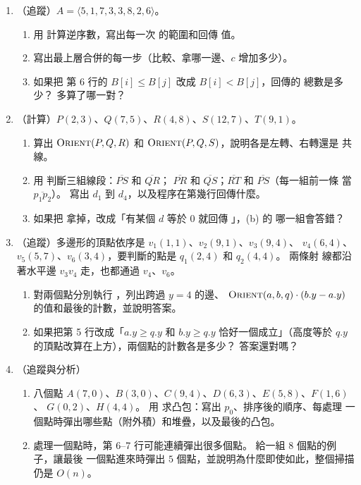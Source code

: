 \begin{enumerate}
\item \label{dc-q-inv}（追蹤）$A = \langle 5, 1, 7, 3, 3, 8, 2, 6 \rangle$。
\begin{enumerate}
\item 用  計算逆序數，寫出每一次  的範圍和回傳
值。
\item 寫出最上層合併的每一步（比較、拿哪一邊、$c$ 增加多少）。
\item 如果把  第 6 行的 $B[i] \le B[j]$ 改成 $B[i] < B[j]$，回傳的
總數是多少？ 多算了哪一對？
\end{enumerate}

\item \label{dc-q-seg}（計算）$P(2, 3)$、$Q(7, 5)$、$R(4, 8)$、$S(12, 7)$、$T(9, 1)$。
\begin{enumerate}
\item 算出 $\proc{Orient}(P, Q, R)$ 和 $\proc{Orient}(P, Q, S)$，說明各是左轉、右轉還是
共線。
\item 用  判斷三組線段：$\overline{PS}$ 和 $\overline{QR}$；
$\overline{PR}$ 和 $\overline{QS}$；$\overline{RT}$ 和 $\overline{PS}$（每一組前一條
當 $\overline{p_1 p_2}$）。 寫出 $d_1$ 到 $d_4$，以及程序在第幾行回傳什麼。
\item 如果把  拿掉，改成「有某個 $d$ 等於 $0$ 就回傳 \TRUE」，(b) 的
哪一組會答錯？
\end{enumerate}

\item \label{dc-q-pip}（追蹤）多邊形的頂點依序是 $v_1(1, 1)$、$v_2(9, 1)$、$v_3(9, 4)$、
$v_4(6, 4)$、$v_5(5, 7)$、$v_6(3, 4)$，要判斷的點是 $q_1(2, 4)$ 和 $q_2(4, 4)$。 兩條射
線都沿著水平邊 $v_3 v_4$ 走，也都通過 $v_4$、$v_6$。
\begin{enumerate}
\item 對兩個點分別執行 ，列出跨過 $y = 4$ 的邊、
$\proc{Orient}(a, b, q) \cdot (b.y - a.y)$ 的值和最後的計數，並說明答案。
\item 如果把第 5 行改成「$a.y \ge q.y$ 和 $b.y \ge q.y$ 恰好一個成立」（高度等於
$q.y$ 的頂點改算在上方），兩個點的計數各是多少？ 答案還對嗎？
\end{enumerate}

\item \label{dc-q-graham}（追蹤與分析）
\begin{enumerate}
\item 八個點 $A(7, 0)$、$B(3, 0)$、$C(9, 4)$、$D(6, 3)$、$E(5, 8)$、$F(1, 6)$、
$G(0, 2)$、$H(4, 4)$。 用  求凸包：寫出 $p_0$、排序後的順序、每處理
一個點時彈出哪些點（附外積）和堆疊，以及最後的凸包。
\item 處理一個點時，第 6--7 行可能連續彈出很多個點。 給一組 $8$ 個點的例子，讓最後
一個點進來時彈出 $5$ 個點，並說明為什麼即使如此，整個掃描仍是 $O(n)$。
\end{enumerate}


\end{enumerate}
